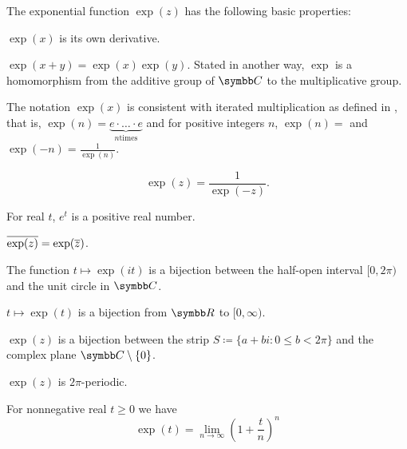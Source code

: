 \begin{proposition}\label{thm:exponential_function_properties}
  The exponential function \( \exp(z) \) has the following basic properties:

  \begin{propenum}
     \( \exp(x) \) is its own derivative.

     \( \exp(x + y) = \exp(x) \exp(y) \). Stated in another way, \( \exp \) is a homomorphism from the additive group of \( \BC \) to the multiplicative group.

     The notation \( \exp(x) \) is consistent with iterated multiplication as defined in , that is, \( \exp(n) = \underbrace{e \cdot \ldots \cdot e}_{n \text{times}} \) and for positive integers \( n \), \( \exp(n) =  \) and \( \exp(-n) =\tfrac 1 {\exp(n)} \).

    \begin{equation*}
      \exp(z) = \frac 1 {\exp(-z)}.
    \end{equation*}

     For real \( t \), \( e^t \) is a positive real number.

     \( \overline{\exp(z)} = \exp(\overline{z}) \).

     The function \( t \mapsto \exp(it) \) is a bijection between the half-open interval \( [0, 2\pi) \) and the unit circle in \( \BC \).

     \( t \mapsto \exp(t) \) is a bijection from \( \BR \) to \( [0, \infty) \).

     \( \exp(z) \) is a bijection between the strip \( S \coloneqq \{ a + bi \colon 0 \leq b < 2\pi \} \) and the complex plane \( \BC \setminus \{ 0 \} \).

     \( \exp(z) \) is \( 2\pi \)-periodic.

     For nonnegative real \( t \geq 0 \) we have
    \begin{equation*}
      \exp(t) = \lim_{n \to \infty} \left(1 + \frac t n \right)^n
    \end{equation*}
  \end{propenum}
\end{proposition}
